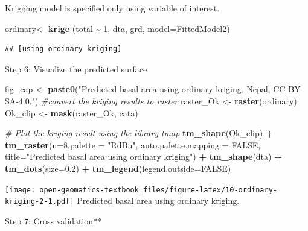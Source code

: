 \documentclass[
]{book}
\newenvironment{Shaded}{\begin{snugshade}}{\end{snugshade}}
\newcommand{\AttributeTok}[1]{\textcolor[rgb]{0.13,0.29,0.53}{#1}}
\newcommand{\CommentTok}[1]{\textcolor[rgb]{0.56,0.35,0.01}{\textit{#1}}}
\newcommand{\ConstantTok}[1]{\textcolor[rgb]{0.56,0.35,0.01}{#1}}
\newcommand{\DecValTok}[1]{\textcolor[rgb]{0.00,0.00,0.81}{#1}}
\newcommand{\FloatTok}[1]{\textcolor[rgb]{0.00,0.00,0.81}{#1}}
\newcommand{\FunctionTok}[1]{\textcolor[rgb]{0.13,0.29,0.53}{\textbf{#1}}}
\newcommand{\NormalTok}[1]{#1}
\newcommand{\OtherTok}[1]{\textcolor[rgb]{0.56,0.35,0.01}{#1}}
\newcommand{\SpecialCharTok}[1]{\textcolor[rgb]{0.81,0.36,0.00}{\textbf{#1}}}
\newcommand{\StringTok}[1]{\textcolor[rgb]{0.31,0.60,0.02}{#1}}
\begin{document}
Krigging model is specified only using variable of interest.

\begin{Shaded}
\begin{Highlighting}[]
\NormalTok{ordinary}\OtherTok{\textless{}{-}} \FunctionTok{krige}\NormalTok{ (total }\SpecialCharTok{\textasciitilde{}} \DecValTok{1}\NormalTok{, dta, grd, }\AttributeTok{model=}\NormalTok{FittedModel2)}
\end{Highlighting}
\end{Shaded}

\begin{verbatim}
## [using ordinary kriging]
\end{verbatim}

Step 6: Visualize the predicted surface

\begin{Shaded}
\begin{Highlighting}[]
\NormalTok{fig\_cap }\OtherTok{\textless{}{-}} \FunctionTok{paste0}\NormalTok{(}\StringTok{"Predicted basal area using ordinary kriging. Nepal, CC{-}BY{-}SA{-}4.0."}\NormalTok{)}
\CommentTok{\#convert the kriging results to raster}
\NormalTok{raster\_Ok      }\OtherTok{\textless{}{-}} \FunctionTok{raster}\NormalTok{(ordinary)}
\NormalTok{Ok\_clip    }\OtherTok{\textless{}{-}} \FunctionTok{mask}\NormalTok{(raster\_Ok, cata)}

\CommentTok{\# Plot the kriging result using the library tmap}
\FunctionTok{tm\_shape}\NormalTok{(Ok\_clip) }\SpecialCharTok{+} 
  \FunctionTok{tm\_raster}\NormalTok{(}\AttributeTok{n=}\DecValTok{8}\NormalTok{,}\AttributeTok{palette =} \StringTok{"RdBu"}\NormalTok{, }\AttributeTok{auto.palette.mapping =} \ConstantTok{FALSE}\NormalTok{,}
            \AttributeTok{title=}\StringTok{"Predicted basal area using ordinary kriging"}\NormalTok{) }\SpecialCharTok{+} 
  \FunctionTok{tm\_shape}\NormalTok{(dta) }\SpecialCharTok{+} \FunctionTok{tm\_dots}\NormalTok{(}\AttributeTok{size=}\FloatTok{0.2}\NormalTok{) }\SpecialCharTok{+}
  \FunctionTok{tm\_legend}\NormalTok{(}\AttributeTok{legend.outside=}\ConstantTok{FALSE}\NormalTok{)}
\end{Highlighting}
\end{Shaded}

\texttt{[image: open-geomatics-textbook\_files/figure-latex/10-ordinary-kriging-2-1.pdf]}
Predicted basal area using ordinary kriging.

Step 7: Cross validation**
\end{document}
